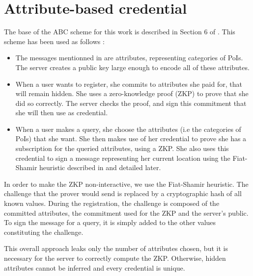 \documentclass[10pt,conference,compsocconf]{IEEEtran}
\begin{document}
\section{Attribute-based credential}
The base of the ABC scheme for this work is described in Section 6 of \cite{PS_Scheme}. This scheme has been used as follows : 
\begin{itemize}
    \item The messages mentionned in \cite{PS_Scheme} are attributes, representing categories of PoIs. The server creates a public key large enough to encode all of these attributes. 
    \item When a user wants to register, she commits to attributes she paid for, that will remain hidden. She uses a zero-knowledge proof (ZKP) to prove that she did so correctly. The server checks the proof, and sign this commitment that she will then use as credential.
    \item When a user makes a query, she choose the attributes (i.e the categories of PoIs) that she want. She then makes use of her credential to prove she has a subscription for the queried attributes, using a ZKP. She also uses this credential to sign a message representing her current location using the Fiat-Shamir heuristic described in \cite{FSheuristic} and detailed later.
\end{itemize}

In order to make the ZKP non-interactive, we use the Fiat-Shamir heuristic. The challenge that the prover would send is replaced by a cryptographic hash of all known values. During the registration, the challenge is composed of the committed attributes, the commitment used for the ZKP and the server's public. To sign the message for a query, it is simply added to the other values constituting the challenge. 

This overall approach leaks only the number of attributes chosen, but it is necessary for the server to correctly compute the ZKP. Otherwise, hidden attributes cannot be inferred and every credential is unique.
\end{document}
